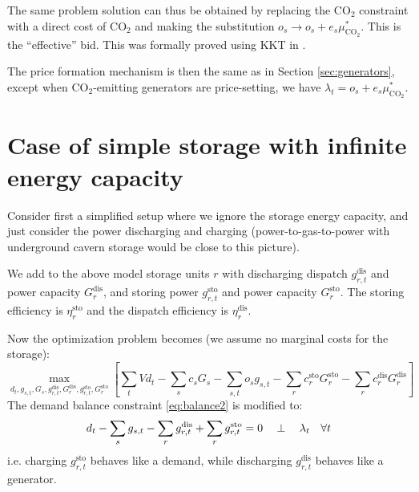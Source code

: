 \documentclass[final,3p,times]{elsarticle}
\def\l{\lambda}
\begin{document}
The same problem solution can thus be obtained by replacing the CO$_2$ constraint with a direct cost of CO$_2$ and making the substitution $o_s \to o_s + e_s \mu^*_{\textrm{CO}_2}$. This is the ``effective'' bid. This was formally proved using KKT in \cite{Brown2020}.

The price formation mechanism is then the same as in Section \ref{sec:generators}, except when CO$_2$-emitting generators are price-setting, we have $\l_t = o_s + e_s \mu^*_{\textrm{CO}_2}$.



\section{Case of simple storage with infinite energy capacity}\label{sec:simple}

Consider first a simplified setup where we ignore the storage energy
capacity, and just consider the power discharging and charging
(power-to-gas-to-power with underground cavern storage would be close to this
picture).

We add to the above model storage units $r$ with discharging dispatch $g^{\textrm{dis}}_{r,t}$ and power capacity $G^{\textrm{dis}}_{r}$, and storing power $g^{\textrm{sto}}_{r,t}$ and power capacity $G^{\textrm{sto}}_{r}$. The storing efficiency is $\eta_r^{\textrm{sto}}$ and the dispatch efficiency is $\eta_r^{\textrm{dis}}$.

Now the optimization problem becomes (we assume no marginal costs for the storage):
\begin{equation}
    \max_{d_{t}, g_{s,t}, G_s,g^{\textrm{dis}}_{r,t},G^{\textrm{dis}}_{r},g^{\textrm{sto}}_{r,t},G^{\textrm{sto}}_{r}}\left[\sum_{t} Vd_{t} -  \sum_s c_s G_s - \sum_{s,t} o_{s} g_{s,t} -\sum_r c^{\textrm{sto}}_r G^{\textrm{sto}}_r -\sum_r c^{\textrm{dis}}_r G^{\textrm{dis}}_r\right]  \label{eq:objsr}
\end{equation}
The demand balance constraint \eqref{eq:balance2} is modified to:
\begin{align}
   d_{t} - \sum_s g_{s,t} - \sum_r g^{\textrm{dis}}_{r,t} + \sum_r g^{\textrm{sto}}_{r,t}  =  0 \hspace{0.34cm}\perp \hspace{0.34cm} \l_t \hspace{0.34cm} \forall t \label{eq:balance3}
\end{align}
i.e. charging $g^{\textrm{sto}}_{r,t}$ behaves like a demand, while discharging $g^{\textrm{dis}}_{r,t}$ behaves like a generator.
\end{document}
